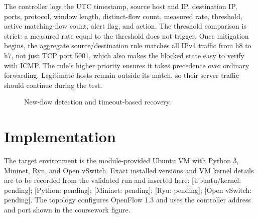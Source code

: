 \documentclass[conference]{IEEEtran}
\begin{document}
The controller logs the UTC timestamp, source host and IP, destination IP, ports, protocol, window length, distinct-flow count, measured rate, threshold, active matching-flow count, alert flag, and action. The threshold comparison is strict: a measured rate equal to the threshold does not trigger. Once mitigation begins, the aggregate source/destination rule matches all IPv4 traffic from h8 to h7, not just TCP port 5001, which also makes the blocked state easy to verify with ICMP. The rule's higher priority ensures it takes precedence over ordinary forwarding. Legitimate hosts remain outside its match, so their server traffic should continue during the test.

\begin{figure}[t]
\centering
{}
\caption{New-flow detection and timeout-based recovery.}
\label{fig:ids}
\end{figure}

\section{Implementation}
The target environment is the module-provided Ubuntu VM with Python 3, Mininet, Ryu, and Open vSwitch. Exact installed versions and VM kernel details are to be recorded from the validated run and inserted here: [Ubuntu/kernel: pending]; [Python: pending]; [Mininet: pending]; [Ryu: pending]; [Open vSwitch: pending]. The topology configures OpenFlow 1.3 and uses the controller address and port shown in the coursework figure.
\end{document}
